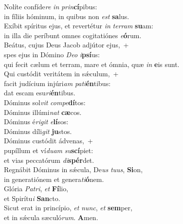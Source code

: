 \evenverse Nolíte confíde\textit{re} \textit{in} \textit{prin}\textbf{cí}pibus:~\*\\
\evenverse in fíliis hóminum, in quibus non \textit{est} \textbf{sa}lus.\\
\oddverse Exíbit spíritus ejus, et revertétur \textit{in} \textit{ter}\textit{ram} \textbf{su}am:~\*\\
\oddverse in illa die períbunt omnes cogitatiónes \textit{e}\textbf{ó}rum.\\
\evenverse Beátus, cujus Deus Jacob adjútor ejus,~+\\
\evenverse  spes ejus in Dómino \textit{De}\textit{o} \textit{i}\textbf{psí}us:~\*\\
\evenverse qui fecit cælum et terram, mare et ómnia, quæ \textit{in} \textbf{e}is sunt.\\
\oddverse Qui custódit veritátem in sǽculum,~+\\
\oddverse  facit judícium injúri\textit{am} \textit{pa}\textit{ti}\textbf{én}tibus:~\*\\
\oddverse dat escam esu\textit{ri}\textbf{én}tibus.\\
\evenverse Dóminus sol\textit{vit} \textit{com}\textit{pe}\textbf{dí}tos:~\*\\
\evenverse Dóminus illúmi\textit{nat} \textbf{cæ}cos.\\
\oddverse Dóminus é\textit{ri}\textit{git} \textit{e}\textbf{lí}sos:~\*\\
\oddverse Dóminus díli\textit{git} \textbf{ju}stos.\\
\evenverse Dóminus custódit ádvenas,~+\\
\evenverse  pupíllum et ví\textit{du}\textit{am} \textit{su}\textbf{scí}piet:~\*\\
\evenverse et vias peccatórum \textit{di}\textbf{spér}det.\\
\oddverse Regnábit Dóminus in sǽcula, De\textit{us} \textit{tu}\textit{us}, \textbf{Si}on,~\*\\
\oddverse in generatiónem et genera\textit{ti}\textbf{ó}nem.\\
\evenverse Glória \textit{Pa}\textit{tri}, \textit{et} \textbf{Fí}lio,~\*\\
\evenverse et Spirítu\textit{i} \textbf{San}cto.\\
\oddverse Sicut erat in princípio, \textit{et} \textit{nunc}, \textit{et} \textbf{sem}per,~\*\\
\oddverse et in sǽcula sæculó\textit{rum}. \textbf{A}men.\\
